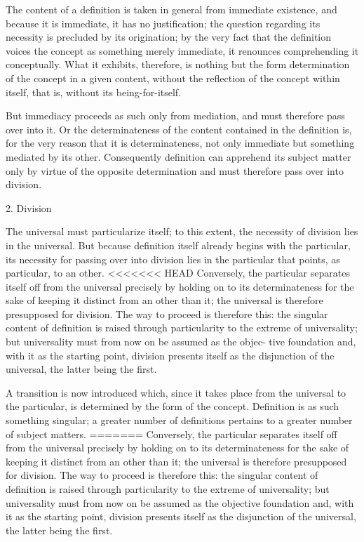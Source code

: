The content of a definition is taken
in general from immediate existence,
and because it is immediate,
it has no justification;
the question regarding its necessity is
precluded by its origination;
by the very fact that the definition voices
the concept as something merely immediate,
it renounces comprehending it conceptually.
What it exhibits, therefore, is nothing but
the form determination of the concept in a given content,
without the reflection of the concept within itself,
that is, without its being-for-itself.

But immediacy proceeds as such only from mediation,
and must therefore pass over into it.
Or the determinateness of the content
contained in the definition is,
for the very reason that it is determinateness,
not only immediate but something mediated by its other.
Consequently definition can apprehend its subject matter
only by virtue of the opposite determination
and must therefore pass over into division.

2. Division

The universal must particularize itself;
to this extent, the necessity of division lies in the universal.
But because definition itself already begins with the particular,
its necessity for passing over into division lies in
the particular that points, as particular, to an other.
<<<<<<< HEAD
Conversely, the particular separates
itself off from the universal precisely by holding on to its determinateness
for the sake of keeping it distinct from an other than it; the universal is
therefore presupposed for division.
The way to proceed is therefore this: the
singular content of definition is raised through particularity to the extreme
of universality;
but universality must from now on be assumed as the objec-
tive foundation and, with it as the starting point, division presents itself as
the disjunction of the universal, the latter being the first.

A transition is now introduced which, since it takes place from the
universal to the particular, is determined by the form of the concept.
Definition is as such something singular; a greater number of definitions
pertains to a greater number of subject matters.
=======
Conversely, the particular separates itself off
from the universal precisely by holding on to its determinateness
for the sake of keeping it distinct from an other than it;
the universal is therefore presupposed for division.
The way to proceed is therefore this:
the singular content of definition is
raised through particularity to the extreme of universality;
but universality must from now on
be assumed as the objective foundation
and, with it as the starting point,
division presents itself as
the disjunction of the universal,
the latter being the first.

